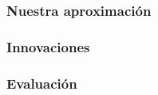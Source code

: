 \documentclass{beamer}
\begin{document}
	\begin{frame}
		\frametitle{Nuestra aproximación}
	\end{frame}
	\begin{frame}
		\frametitle{Innovaciones}
	\end{frame}
	\begin{frame}
		\frametitle{Evaluación}
	\end{frame}

\end{document}
